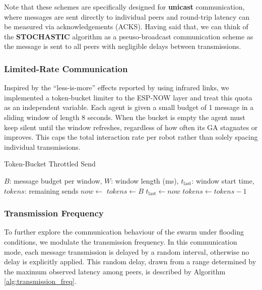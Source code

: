 \documentclass[conference]{IEEEtran}
\begin{document}
Note that these schemes are specifically designed for \textbf{unicast} communication, where messages are sent directly to individual peers and round-trip latency can be measured via acknowledgements (ACKS). Having said that, we can think of the \textbf{STOCHASTIC} algorithm as a pseuso-broadcast communication scheme as the message is sent to all peers with negligible delays between transmissions.\\ 

\subsubsection{Limited-Rate Communication}\label{sec:limited-rate}

Inspired by the “less-is-more” effects reported by \cite{aust_hidden_2022} using infrared links, we implemented a token-bucket limiter to the ESP-NOW layer and treat this quota as an independent variable. Each agent is given a small budget of 1 message in a sliding window of length 8 seconds.  When the bucket is empty the agent must keep silent until the window refreshes, regardless of how often its GA stagnates or improves.  This caps the total interaction rate per robot rather than solely spacing individual transmissions.

\begin{algorithm}[H]
\caption{Token-Bucket Throttled Send}
\label{alg:token_bucket}
\begin{algorithmic}[1]
\Require 
  $B$: message budget per window, \quad
  $W$: window length (ms), \quad
  $t_{\mathrm{last}}$: window start time, \quad
  $\mathit{tokens}$: remaining sends
  \State $now \gets$ 
   
    \State $\mathit{tokens} \gets B$
    \State $t_{\mathrm{last}} \gets now$
  \EndIf
    \State \Return {}
  \EndIf
    \State $\mathit{tokens} \gets \mathit{tokens} - 1$
    \State {}
  \EndIf
\EndProcedure
\end{algorithmic}
\end{algorithm}

\subsubsection{Transmission Frequency}\label{sec:transmission-frequency}

To further explore the communication behaviour of the swarm under flooding conditions, we modulate the transmission frequency. In this communication mode, each message transmission is delayed by a random interval, otherwise no delay is explicitly applied. This random delay, drawn from a range determined by the maximum observed latency among peers, is described by Algorithm \ref{alg:transmission_freq}.\\
\end{document}
